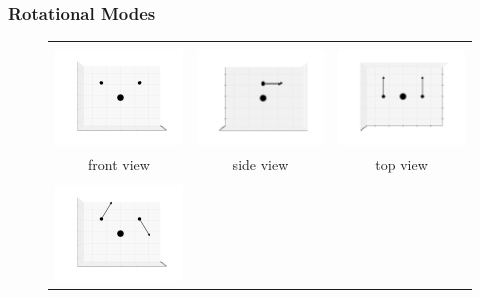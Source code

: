 \documentclass[11pt]{article}
\begin{document}
\subsubsection{Rotational Modes}
\label{rot}
\begin{figure}[htp]
    \centering
    \begin{tabular}{|ccc|}\hline&&\\
    \includegraphics[width=5.5cm,clip=true,trim=3cm 2cm 3cm 2cm]{images/0-0_3.pdf}&
    \includegraphics[width=5.5cm,clip=true,trim=3cm 2cm 3cm 2cm]{images/0-90_3.pdf}&
    \includegraphics[width=5.5cm,clip=true,trim=3cm 2cm 3cm 2cm]{images/90-0_3.pdf}\\front view&side view&top view\\\hline&&\\
    \includegraphics[width=5.5cm,clip=true,trim=3cm 2cm 3cm 2cm]{images/0-0_4.pdf}&

\end{tabular}
\end{figure}
\end{document}
